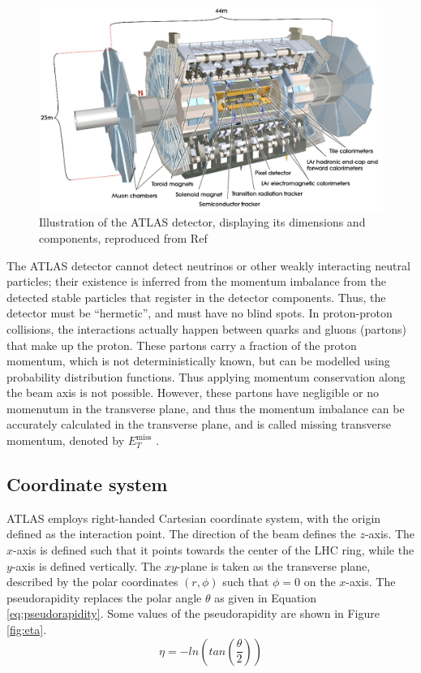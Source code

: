 \documentclass[12pt,a4paper,openright,twoside]{report}
\newcommand{\met}{$E_T^{\mathrm{miss}}$ }
\newcommand{\myequations}[1]{%
\addcontentsline{equ}{myequations}{\protect\numberline{\theequation}#1}\par}
\begin{document}
\begin{figure}[h]
\centering
\includegraphics[width=\textwidth]{ATLAS.png}
\caption{Illustration of the ATLAS detector, displaying its dimensions and components, reproduced from Ref \cite{ATLAS_detector}}
\label{fig:ATLAS}
\end{figure}

The ATLAS detector cannot detect neutrinos or other weakly interacting neutral particles; their existence is inferred from the momentum imbalance from the detected stable particles that register in the detector components. Thus, the detector must be ``hermetic'', and must have no blind spots. In proton-proton collisions, the interactions actually happen between quarks and gluons (partons) that make up the proton. These partons carry a fraction of the proton momentum, which is not deterministically known, but can be modelled using probability distribution functions. Thus applying momentum conservation along the beam axis is not possible. However, these partons have negligible or no momenutum in the transverse plane, and thus the momentum imbalance can be accurately calculated in the transverse plane, and is called missing transverse momentum, denoted by \met.

\subsection{Coordinate system}
ATLAS employs right-handed Cartesian coordinate system, with the origin defined as the interaction point. The direction of the beam defines the $z$-axis. The $x$-axis is defined such that it points towards the center of the LHC ring, while the $y$-axis is defined vertically. The $xy$-plane is taken as the transverse plane, described by the polar coordinates $(r,\phi)$ such that $\phi=0$ on the $x$-axis. The pseudorapidity replaces the polar angle $\theta$ as given in Equation \ref{eq:pseudorapidity}. Some values of the pseudorapidity are shown in Figure \ref{fig:eta}.
\begin{equation}
\eta = -ln\left(tan\left(\frac{\theta}{2}\right)\right)
\label{eq:pseudorapidity}
\end{equation}
\myequations{Pseudorapidity $\eta$}
\end{document}
